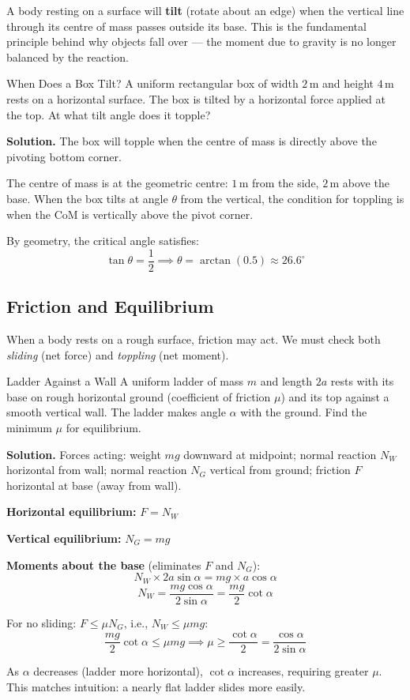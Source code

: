 \documentclass[12pt, a4paper]{book}
\newcommand{\m}{\,\mathrm{m}}
\begin{document}
\begin{intuitionbox}
A body resting on a surface will \textbf{tilt} (rotate about an edge) when the vertical line through its centre of mass passes outside its base. This is the fundamental principle behind why objects fall over --- the moment due to gravity is no longer balanced by the reaction.
\end{intuitionbox}

\begin{exmp}{When Does a Box Tilt?}{}
A uniform rectangular box of width $2\m$ and height $4\m$ rests on a horizontal surface. The box is tilted by a horizontal force applied at the top. At what tilt angle does it topple?

\textbf{Solution.} The box will topple when the centre of mass is directly above the pivoting bottom corner.

The centre of mass is at the geometric centre: $1\m$ from the side, $2\m$ above the base. When the box tilts at angle $\theta$ from the vertical, the condition for toppling is when the CoM is vertically above the pivot corner.

By geometry, the critical angle satisfies:
\[
  \tan\theta = \frac{1}{2} \implies \theta = \arctan(0.5) \approx 26.6^\circ
\]
\end{exmp}

\subsection{Friction and Equilibrium}

When a body rests on a rough surface, friction may act. We must check both \emph{sliding} (net force) and \emph{toppling} (net moment).

\begin{exmp}{Ladder Against a Wall}{}
A uniform ladder of mass $m$ and length $2a$ rests with its base on rough horizontal ground (coefficient of friction $\mu$) and its top against a smooth vertical wall. The ladder makes angle $\alpha$ with the ground. Find the minimum $\mu$ for equilibrium.

\medskip
\textbf{Solution.} Forces acting: weight $mg$ downward at midpoint; normal reaction $N_W$ horizontal from wall; normal reaction $N_G$ vertical from ground; friction $F$ horizontal at base (away from wall).

\textbf{Horizontal equilibrium:} $F = N_W$

\textbf{Vertical equilibrium:} $N_G = mg$

\textbf{Moments about the base} (eliminates $F$ and $N_G$):
\[
  N_W \times 2a\sin\alpha = mg \times a\cos\alpha
\]
\[
  N_W = \frac{mg\cos\alpha}{2\sin\alpha} = \frac{mg}{2}\cot\alpha
\]

For no sliding: $F \leq \mu N_G$, i.e., $N_W \leq \mu mg$:
\[
  \frac{mg}{2}\cot\alpha \leq \mu mg \implies \mu \geq \frac{\cot\alpha}{2} = \frac{\cos\alpha}{2\sin\alpha}
\]

As $\alpha$ decreases (ladder more horizontal), $\cot\alpha$ increases, requiring greater $\mu$. This matches intuition: a nearly flat ladder slides more easily.
\end{exmp}
\end{document}
